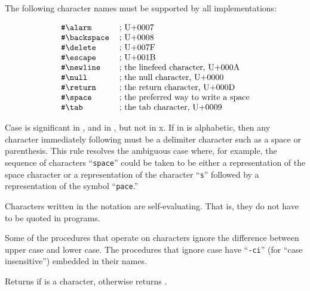 The following character names must be supported
by all implementations:

$$
\begin{tabular}{ll}
{\tt \#\backwhack{}alarm}&; \textrm{U+0007}\\
{\tt \#\backwhack{}backspace}&; \textrm{U+0008}\\
{\tt \#\backwhack{}delete}&; \textrm{U+007F}\\
{\tt \#\backwhack{}escape}&; \textrm{U+001B}\\
{\tt \#\backwhack{}newline}&; the linefeed character, \textrm{U+000A}\\
{\tt \#\backwhack{}null}&; the null character, \textrm{U+0000}\\
{\tt \#\backwhack{}return}&; the return character, \textrm{U+000D}\\
{\tt \#\backwhack{}space}&; the preferred way to write a space\\
{\tt \#\backwhack{}tab}&; the tab character, \textrm{U+0009}\\
\end{tabular}
$$

Case is significant in \sharpsign\backwhack{}, and in
\sharpsign{},
but not in {\cf\sharpsign\backwhack{}x}.  
If  in
\sharpsign\backwhack{} is alphabetic, then any character
immediately following  must be a delimiter character such as a
space or parenthesis.  This rule resolves the ambiguous case where, for
example, the sequence of characters ``{\tt\sharpsign\backwhack space}''
could be taken to be either a representation of the space character or a
representation of the character ``{\tt\sharpsign\backwhack s}'' followed
by a representation of the symbol ``{\tt pace}.''

Characters written in the \sharpsign\backwhack{} notation are self-evaluating.
That is, they do not have to be quoted in programs.  

\vest Some of the procedures that operate on characters ignore the
difference between upper case and lower case.  The procedures that
ignore case have \hbox{``{\tt -ci}''} (for ``case
insensitive'') embedded in their names.


\begin{entry}{%
}

Returns \schtrue{} if  is a character, otherwise returns \schfalse.

\end{entry}


